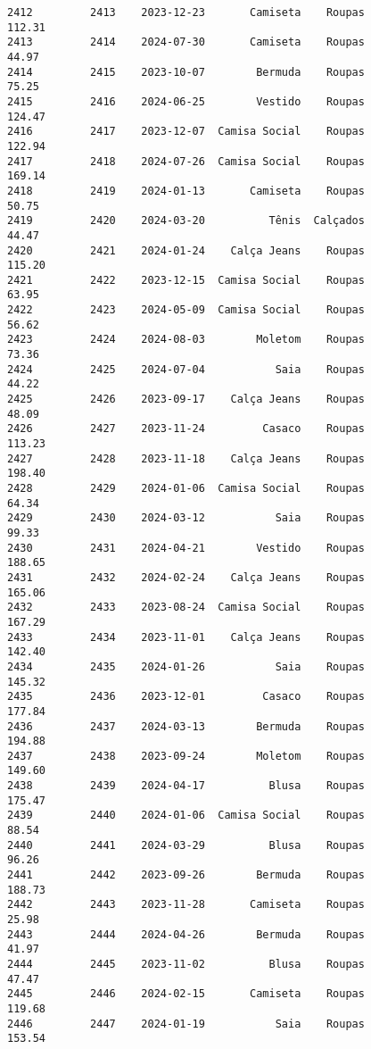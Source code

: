 \documentclass[11pt]{article}
\begin{document}
\begin{Verbatim}[commandchars=\\\{\}]
2412         2413    2023-12-23       Camiseta    Roupas          112.31   
2413         2414    2024-07-30       Camiseta    Roupas           44.97   
2414         2415    2023-10-07        Bermuda    Roupas           75.25   
2415         2416    2024-06-25        Vestido    Roupas          124.47   
2416         2417    2023-12-07  Camisa Social    Roupas          122.94   
2417         2418    2024-07-26  Camisa Social    Roupas          169.14   
2418         2419    2024-01-13       Camiseta    Roupas           50.75   
2419         2420    2024-03-20          Tênis  Calçados           44.47   
2420         2421    2024-01-24    Calça Jeans    Roupas          115.20   
2421         2422    2023-12-15  Camisa Social    Roupas           63.95   
2422         2423    2024-05-09  Camisa Social    Roupas           56.62   
2423         2424    2024-08-03        Moletom    Roupas           73.36   
2424         2425    2024-07-04           Saia    Roupas           44.22   
2425         2426    2023-09-17    Calça Jeans    Roupas           48.09   
2426         2427    2023-11-24         Casaco    Roupas          113.23   
2427         2428    2023-11-18    Calça Jeans    Roupas          198.40   
2428         2429    2024-01-06  Camisa Social    Roupas           64.34   
2429         2430    2024-03-12           Saia    Roupas           99.33   
2430         2431    2024-04-21        Vestido    Roupas          188.65   
2431         2432    2024-02-24    Calça Jeans    Roupas          165.06   
2432         2433    2023-08-24  Camisa Social    Roupas          167.29   
2433         2434    2023-11-01    Calça Jeans    Roupas          142.40   
2434         2435    2024-01-26           Saia    Roupas          145.32   
2435         2436    2023-12-01         Casaco    Roupas          177.84   
2436         2437    2024-03-13        Bermuda    Roupas          194.88   
2437         2438    2023-09-24        Moletom    Roupas          149.60   
2438         2439    2024-04-17          Blusa    Roupas          175.47   
2439         2440    2024-01-06  Camisa Social    Roupas           88.54   
2440         2441    2024-03-29          Blusa    Roupas           96.26   
2441         2442    2023-09-26        Bermuda    Roupas          188.73   
2442         2443    2023-11-28       Camiseta    Roupas           25.98   
2443         2444    2024-04-26        Bermuda    Roupas           41.97   
2444         2445    2023-11-02          Blusa    Roupas           47.47   
2445         2446    2024-02-15       Camiseta    Roupas          119.68   
2446         2447    2024-01-19           Saia    Roupas          153.54   

\end{Verbatim}
\end{document}
